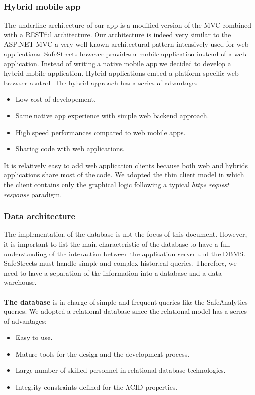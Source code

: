 \documentclass[./main.tex]{subfiles}
\begin{document}
\subsubsection{Hybrid mobile app}
The underline architecture of our app is a modified version of the MVC combined with a RESTful architecture. Our architecture is indeed very similar to the ASP.NET MVC a very well known architectural pattern intensively used for web applications. SafeStreets however provides a mobile application instead of a web application. Instead of writing a native mobile app we decided to develop a hybrid mobile application. Hybrid applications embed a platform-specific web browser control. The hybrid approach has a series of advantages. 
\begin{itemize}
\item Low cost of developement.
\item Same native app experience with simple web backend approach.
\item High speed performances compared to web mobile apps.
\item Sharing code with web applications.
\end{itemize}

It is relatively easy to add web application clients because both web and hybrids applications share most of the code. We adopted the thin client model in which the client contains only the graphical logic following a typical \textit{ https request response } paradigm.

\subsubsection{Data architecture}

The implementation of the database is not the focus of this document. However, it is important to list the main characteristic of the database to have a full understanding of the interaction between the application server and the DBMS.
SafeStreets must handle simple and complex historical queries. Therefore, we need to have a separation of the information into a database and a data warehouse.\\\\
\textbf{The database} is in charge of simple and frequent queries like the SafeAnalytics queries. We adopted a relational database since the relational model has a series of advantages:
\begin{itemize}
\item Easy to use.
\item Mature tools for the design and the development process.
\item Large number of skilled personnel in relational database technologies.
\item Integrity constraints defined for the ACID properties.
\end{itemize} 
\end{document}
